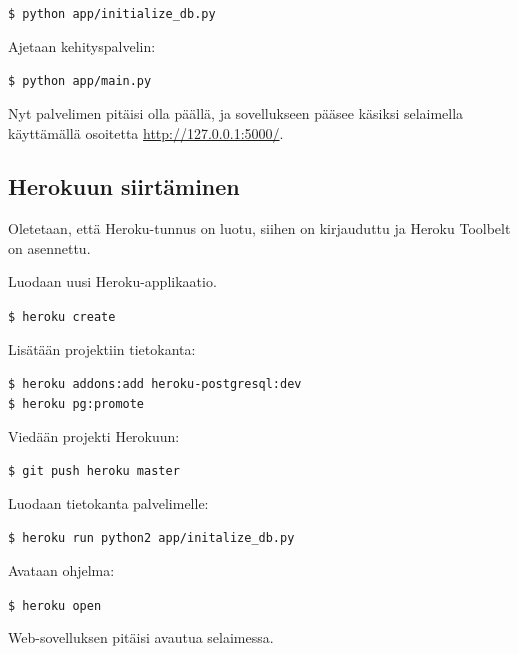 \documentclass{article}
\begin{document}
\texttt{\$ python app/initialize\_db.py}

Ajetaan kehityspalvelin:

\texttt{\$ python app/main.py}

Nyt palvelimen pitäisi olla päällä, ja sovellukseen pääsee käsiksi selaimella käyttämällä osoitetta \url{http://127.0.0.1:5000/}.

\subsection{Herokuun siirtäminen}

Oletetaan, että Heroku-tunnus on luotu, siihen on kirjauduttu ja Heroku Toolbelt on asennettu.

Luodaan uusi Heroku-applikaatio.

\texttt{\$ heroku create}

Lisätään projektiin tietokanta:

\texttt{\$ heroku addons:add heroku-postgresql:dev} \\
\texttt{\$ heroku pg:promote}

Viedään projekti Herokuun:

\texttt{\$ git push heroku master}

Luodaan tietokanta palvelimelle:

\texttt{\$ heroku run python2 app/initalize\_db.py}

Avataan ohjelma:

\texttt{\$ heroku open}

Web-sovelluksen pitäisi avautua selaimessa.
\end{document}
